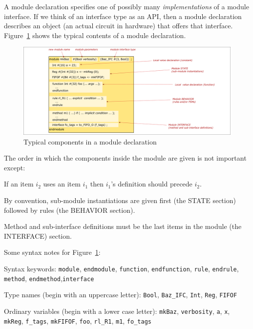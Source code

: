 A module declaration specifies one of possibly many
\emph{implementations} of a module interface.  If we think of an
interface type as an API, then a module declaration describes an
object (an actual circuit in hardware) that offers that interface.
Figure~\ref{Fig_BSV_whats_in_a_module_decl} shows the typical contents
of a module declaration.
\begin{figure}[htbp]
  \centerline{\includegraphics[width=6in,angle=0]{Figures/Fig_BSV_whats_in_a_module_decl}}
  \caption{\label{Fig_BSV_whats_in_a_module_decl}
           Typical components in a module declaration}
\end{figure}

The order in which the components inside the module are given is not
important except:

\begin{tightlist}

 \item If an item $i_2$ uses an item $i_1$ then $i_1$'s definition
       should precede $i_2$.

 \item By convention, sub-module instantiations are given first (the STATE section)
       followed by rules (the BEHAVIOR section).

 \item Method and sub-interface definitions must be the last items in
       the module (the INTERFACE) section.

\end{tightlist}

Some syntax notes for Figure~\ref{Fig_BSV_whats_in_a_module_decl}:

\begin{tightlist}

 \item Syntax keywords: \verb|module|, \verb|endmodule|,
       \verb|function|, \verb|endfunction|, \verb|rule|,
       \verb|endrule|, \verb|method|,
       \verb|endmethod|,\verb|interface|

 \item Type names (begin with an uppercase letter): \verb|Bool|,
       \verb|Baz_IFC|, \verb|Int|, \verb|Reg|, \verb|FIFOF|

 \item Ordinary variables (begin with a lower case letter): \verb|mkBaz|,
       \verb|verbosity|, \verb|a|, \verb|x|, \verb|mkReg|, \verb|f_tags|,
       \verb|mkFIFOF|,
       \verb|foo|,
       \verb|rl_R1|,
       \verb|m1|,
       \verb|fo_tags|

\end{tightlist}

